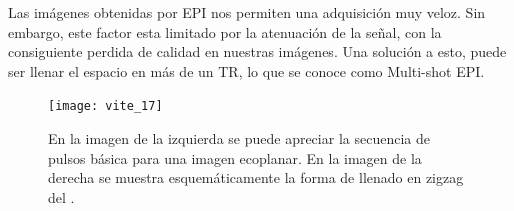 Las imágenes obtenidas por EPI nos permiten una adquisición muy veloz. Sin embargo, este factor esta limitado por la atenuación de la señal, con la consiguiente perdida de calidad en nuestras imágenes. Una solución a esto, puede ser llenar el espacio en más de un TR, lo que se conoce como Multi-shot EPI. 


\begin{figure}[htb]
\begin{figg}
   \texttt{[image: vite\_17]}
   \caption{En la imagen de la izquierda se puede apreciar la secuencia de pulsos básica para una imagen ecoplanar. En la imagen de la derecha se muestra esquemáticamente la forma de llenado en zigzag del \espaciok.}
 \label{fig:seq_EPI}
 \end{figg}
\end{figure}




